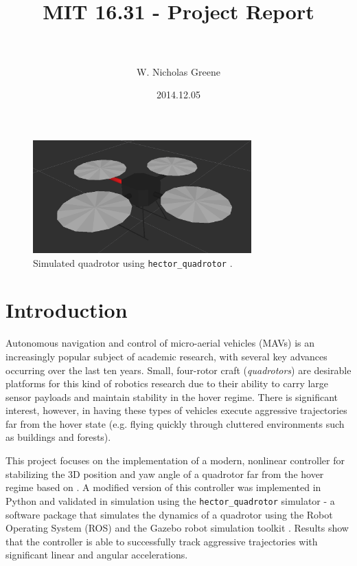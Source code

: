 \documentclass[paper=letter, fontsize=11pt]{scrartcl} %
\title{
\normalfont \normalsize
\horrule{0.5pt} \\[0.4cm] %
\huge MIT 16.31 - Project Report \\ %
\horrule{2pt} \\[0.5cm] %
}
\author{W. Nicholas Greene} %
\date{\normalsize2014.12.05} %
\numberwithin{equation}{section} %
\numberwithin{figure}{section} %
\numberwithin{table}{section} %
\begin{document}
\maketitle %


\begin{figure}[h]
  \centering
  \includegraphics[width=0.75\textwidth]{quadrotor_screenshot_cropped}
  \caption{Simulated quadrotor using \texttt{hector\_quadrotor} \cite{2012simpar_meyer}.}
\end{figure}

\section{Introduction}
Autonomous navigation and control of micro-aerial vehicles (MAVs) is an increasingly popular
subject of academic research, with several key advances occurring over the last ten years.
Small, four-rotor craft (\textit{quadrotors}) are desirable platforms for this kind of
robotics research due to their ability to carry large sensor payloads and maintain stability
in the hover regime. There is significant interest, however, in having these types of vehicles
execute aggressive trajectories far from the hover state (e.g. flying quickly through
cluttered environments such as buildings and forests).

This project focuses on the implementation of a modern, nonlinear controller for stabilizing the
3D position and yaw angle of a quadrotor far from the hover regime based on \cite{lee2010geometric}.
A modified version of this controller was implemented in Python and validated
in simulation using the \texttt{hector\_quadrotor} simulator - a software package that simulates the
dynamics of a quadrotor using the Robot Operating System (ROS) and the Gazebo robot
simulation toolkit \cite{2012simpar_meyer, quigley2009ros, koenig2004design}. Results
show that the controller is able to successfully track aggressive trajectories with
significant linear and angular accelerations.
\end{document}
